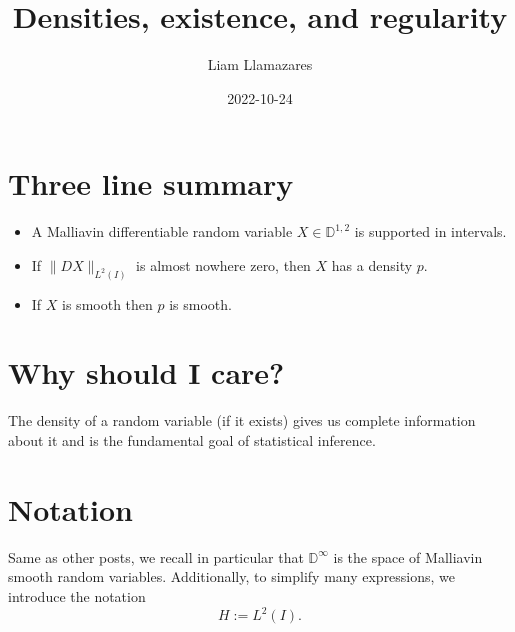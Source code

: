 \documentclass[12pt]{article}
\begin{document}
\begin{CJK*}{UTF8}{gbsn}
	\title{Densities, existence, and regularity}
	\author{Liam Llamazares}
	\date{2022-10-24}
	\maketitle
	\section{ Three line summary}
	\begin{itemize}
		\item A Malliavin differentiable random variable $X\in \mathbb{D}^{1,2}$ is supported in intervals.
		\item If $\|DX\|_{L^2(I)}$ is almost nowhere zero, then  $X$ has a density  $p$.
		\item If  $X$ is smooth then  $p$ is smooth.
	\end{itemize}
	\section{Why should I care?}
	The density of a random variable (if it exists) gives us complete information about it and is the fundamental goal of statistical inference.
	\section{Notation}
	Same as other posts, we recall in particular that $\mathbb{D}^\infty$ is the space of Malliavin smooth random variables. Additionally, to simplify many expressions, we  introduce the notation
	\begin{equation*}
		H:=L^2(I).
	\end{equation*}


\end{CJK*}
\end{document}
